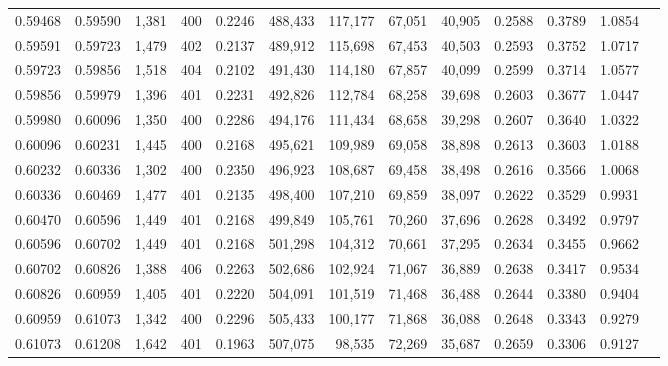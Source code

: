 \begin{tabular}{rrrrrrrrrrrrr}
0.59468 & 0.59590 & 1,381 & 400 &                                     0.2246 & 488,433 & 117,177 &  67,051 &  40,905 & 0.2588 & 0.3789 & 1.0854 \\
0.59591 & 0.59723 & 1,479 & 402 &                                     0.2137 & 489,912 & 115,698 &  67,453 &  40,503 & 0.2593 & 0.3752 & 1.0717 \\
0.59723 & 0.59856 & 1,518 & 404 &                                     0.2102 & 491,430 & 114,180 &  67,857 &  40,099 & 0.2599 & 0.3714 & 1.0577 \\
0.59856 & 0.59979 & 1,396 & 401 &                                     0.2231 & 492,826 & 112,784 &  68,258 &  39,698 & 0.2603 & 0.3677 & 1.0447 \\
0.59980 & 0.60096 & 1,350 & 400 &                                     0.2286 & 494,176 & 111,434 &  68,658 &  39,298 & 0.2607 & 0.3640 & 1.0322 \\
0.60096 & 0.60231 & 1,445 & 400 &                                     0.2168 & 495,621 & 109,989 &  69,058 &  38,898 & 0.2613 & 0.3603 & 1.0188 \\
0.60232 & 0.60336 & 1,302 & 400 &                                     0.2350 & 496,923 & 108,687 &  69,458 &  38,498 & 0.2616 & 0.3566 & 1.0068 \\
0.60336 & 0.60469 & 1,477 & 401 &                                     0.2135 & 498,400 & 107,210 &  69,859 &  38,097 & 0.2622 & 0.3529 & 0.9931 \\
0.60470 & 0.60596 & 1,449 & 401 &                                     0.2168 & 499,849 & 105,761 &  70,260 &  37,696 & 0.2628 & 0.3492 & 0.9797 \\
0.60596 & 0.60702 & 1,449 & 401 &                                     0.2168 & 501,298 & 104,312 &  70,661 &  37,295 & 0.2634 & 0.3455 & 0.9662 \\
0.60702 & 0.60826 & 1,388 & 406 &                                     0.2263 & 502,686 & 102,924 &  71,067 &  36,889 & 0.2638 & 0.3417 & 0.9534 \\
0.60826 & 0.60959 & 1,405 & 401 &                                     0.2220 & 504,091 & 101,519 &  71,468 &  36,488 & 0.2644 & 0.3380 & 0.9404 \\
0.60959 & 0.61073 & 1,342 & 400 &                                     0.2296 & 505,433 & 100,177 &  71,868 &  36,088 & 0.2648 & 0.3343 & 0.9279 \\
0.61073 & 0.61208 & 1,642 & 401 &                                     0.1963 & 507,075 &  98,535 &  72,269 &  35,687 & 0.2659 & 0.3306 & 0.9127 \\

\end{tabular}
